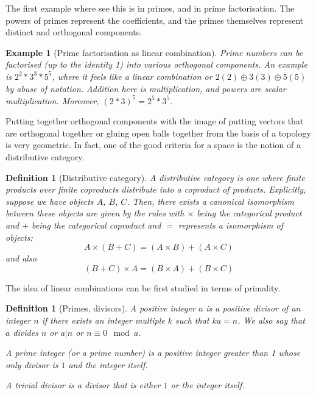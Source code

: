 \documentclass{tufte-book}
\newtheorem{definition}[theorem]{Definition}
\newtheorem{example}[theorem]{Example}
\begin{document}
The first example where see this is in primes, and in prime factorisation. The powers of primes represent the coefficients, and the primes themselves represent distinct and orthogonal components.

\begin{example}[Prime factorisation as linear combination]
  Prime numbers can be factorised (up to the identity 1) into various orthogonal components. An example is $2^2 * 3^3 * 5^5$, where it feels like a linear combination or $2(2) \oplus 3(3) \oplus 5(5)$ by abuse of notation. Addition here is multiplication, and powers are scalar multiplication.
  Moreover, $(2 * 3)^{5} = 2^5 * 3^5$.
\end{example}

Putting together orthogonal components with the image of putting vectors that are orthogonal together or gluing open balls together from the basis of a topology is very geometric. In fact, one of the good criteria for a space is the notion of a distributive category.

\begin{definition}[Distributive category]
  A distributive category is one where finite products over finite coproducts distribute into a coproduct of products. Explicitly, suppose we have objects $A$, $B$, $C$. Then, there exists a canonical isomorphism between these objects are given by the rules with $\times$ being the categorical product and $+$ being the categorical coproduct and $=$ represents a isomorphism of objects:
  \begin{equation}
    A \times (B + C) = (A \times B) + (A \times C) 
  \end{equation}
  and also
  \begin{equation}
    (B + C) \times A = (B \times A) + (B \times C) 
  \end{equation}
\end{definition}

The idea of linear combinations can be first studied in terms of primality.

\begin{definition}[Primes, divisors]
  A positive integer $a$ is a positive divisor of an integer $n$ if there exists an integer multiple $k$ such that $ka = n$. We also say that $a$ divides $n$ or $a | n$ or $n \equiv 0 \mod a$.

  A prime integer (or a prime number) is a positive integer greater than 1  whose only divisor is $1$ and the integer itself.

  A trivial divisor is a divisor that is either $1$ or the integer itself.
\end{definition}
\end{document}
